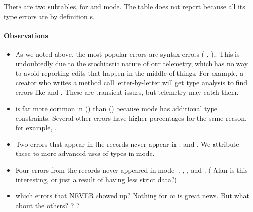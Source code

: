 \documentclass[english,submission,cleveref]{programming}
\begin{document}
There are two subtables, for \mnonstrict{} and \mstrict{} mode.
The table does not report \mnocheck{} because all its type errors are
by definition s.

\paragraph{Observations}

\begin{itemize}
  \item
    As we noted above, the most popular errors are syntax errors
    (\FILL{}  \mnonstrict{},  \mstrict{})..
    This is undoubtedly due to the stochiastic nature
    of our telemetry, which has no way to avoid
    reporting edits that happen in the middle of things.
    For example, a creator who writes a method call
     letter-by-letter will
    get type analysis to find errors like 
    and .
    These are transient issues, but telemetry may catch them.

  \item
     is far more common in \mstrict{} ()
    than \mnonstrict{} () because \mstrict{} mode
    has additional type constraints.
    Several other errors have higher \mstrict{} percentages for the
    same reason, for example, .

  \item
    Two errors that appear in the \mstrict{} records
    never appear in \mnonstrict{}:  and .
    We attribute these to more advanced uses of types in \mstrict{} mode.

  \item
    Four errors from the \mnonstrict{} records never appeared in \mstrict{} mode:
    , ,
    , and .
    (\FILL{} Alan is this interesting, or just a result of having less strict data?)

  \item
    \FILL{} which errors that NEVER showed up?
    Nothing for  or  is great news.
    But what about the others?
    ?
    ?

\end{itemize}
\end{document}
